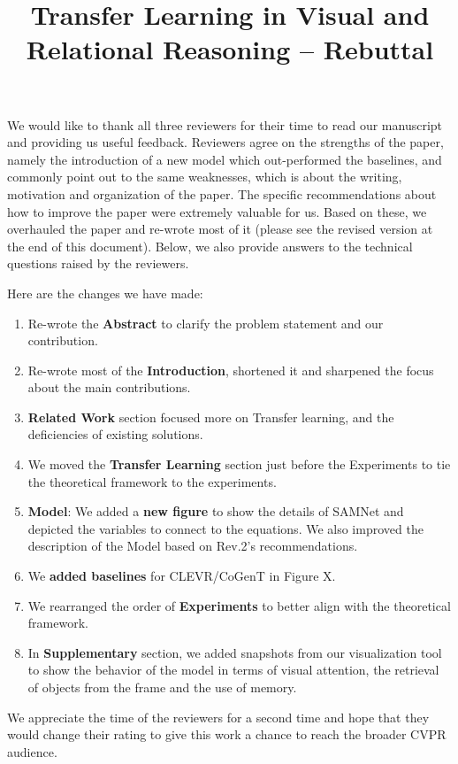 \documentclass[10pt,twocolumn,letterpaper]{article}
\begin{document}
\title{Transfer Learning in Visual and Relational Reasoning -- Rebuttal}
\maketitle
\thispagestyle{empty}

We would like to thank all three reviewers for their time to read our manuscript and providing us useful feedback.  Reviewers agree on the strengths of the paper, namely the introduction of a new model which out-performed the baselines, and commonly point out to the same weaknesses, which is about the writing, motivation and organization of the paper.   The specific recommendations about how to improve the paper were extremely valuable for us.  Based on these, we overhauled the paper and re-wrote most of it (please see the revised version at the end of this document).    Below, we also provide answers to the technical questions raised by the reviewers.

Here are the changes we have made:
\begin{enumerate}
	\item Re-wrote the \textbf{Abstract} to clarify the problem statement and our contribution.
	\item Re-wrote most of the \textbf{Introduction}, shortened it and sharpened the focus about the main contributions.
	\item \textbf{Related Work} section focused more on Transfer learning, and the deficiencies of existing solutions.
	\item We moved the \textbf{Transfer Learning} section just before the Experiments to tie the theoretical framework to the experiments.
	\item \textbf{Model}:  We added a \textbf{new figure} to show the details of SAMNet and depicted the variables to connect to the equations.  We also improved the description of the Model based on Rev.2's recommendations.
	\item We \textbf{added baselines} for CLEVR/CoGenT in Figure X.
	\item We rearranged the order of \textbf{Experiments} to better align with the theoretical framework.
	\item In \textbf{Supplementary} section, we added snapshots from our visualization tool to show the behavior of the model in terms of visual attention, the retrieval of objects from the frame and the use of memory.
\end{enumerate}

We appreciate the time of the reviewers for a second time and hope that they would change their rating to give this work a chance to reach the broader CVPR audience.
\end{document}
